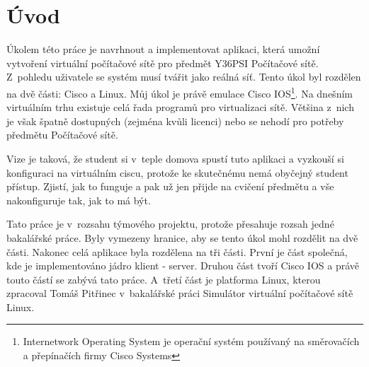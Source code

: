\chapter{Úvod} \label{uvod}


Úkolem této práce je navrhnout a implementovat aplikaci, která umožní vytvoření virtuální počítačové sítě pro předmět Y36PSI Počítačové sítě. Z~pohledu uživatele se systém musí tvářit jako reálná síť. Tento úkol byl rozdělen na dvě části: Cisco a Linux. Můj úkol je právě emulace Cisco IOS\footnote{Internetwork Operating System je operační systém používaný na směrovačích a přepínačích firmy Cisco Systems}. Na dnešním virtuálním trhu existuje celá řada programů pro virtualizaci sítě. Většina z~nich je však špatně dostupných (zejména kvůli licenci) nebo se nehodí pro potřeby předmětu Počítačové sítě. 

Vize je taková, že student si v~teple domova spustí tuto aplikaci a vyzkouší si konfiguraci na virtuálním ciscu, protože ke skutečnému nemá obyčejný student přístup. Zjistí, jak to funguje a pak už jen přijde na cvičení předmětu a vše nakonfiguruje tak, jak to má být. 

Tato práce je v~rozsahu týmového projektu, protože přesahuje rozsah jedné bakalářské práce. Byly vymezeny hranice, aby se tento úkol mohl rozdělit na dvě části. Nakonec celá aplikace byla rozdělena na tři části. První je část společná, kde je implementováno jádro klient - server. Druhou část tvoří Cisco IOS a právě touto částí se zabývá tato práce. A~třetí část je platforma Linux, kterou zpracoval Tomáš Pitřinec v~bakalářské práci Simulátor virtuální počítačové sítě Linux.

